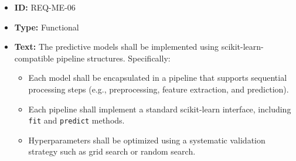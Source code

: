 \documentclass[runningheads]{llncs}
\begin{document}
\begin{itemize}
          \vspace{1em}
    \item \textbf{ID:} REQ-ME-06
    \item \textbf{Type:} Functional
    \item \textbf{Text:} The predictive models shall be implemented using scikit-learn-compatible pipeline structures. Specifically:
          \begin{itemize}
              \item Each model shall be encapsulated in a pipeline that supports sequential processing steps (e.g., preprocessing, feature extraction, and prediction).
              \item Each pipeline shall implement a standard scikit-learn interface, including \texttt{fit} and \texttt{predict} methods.
              \item Hyperparameters shall be optimized using a systematic validation strategy such as grid search or random search.
          \end{itemize}
\end{itemize}
\end{document}
